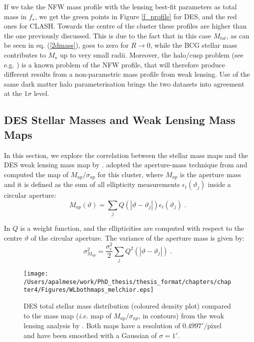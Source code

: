 {If we take the NFW mass profile with the lensing best-fit parameters as total mass in $f_{\star}$, we get the green points in Figure \ref{f_profile} for DES, and the red ones for CLASH. Towards the centre of the cluster these profiles are higher than the one previously discussed. This is due to the fact that in this case $M_{tot}$, as  can be seen in eq. (\ref{2dmass}), goes to zero for $R \to 0$, while the BCG stellar mass contributes to $M_\star$ up to very small radii. Moreover, the halo/cusp problem (see e.g. \citealt{cusp}) is a known problem of the NFW profile, that will therefore produce different results from a non-parametric mass profile from weak lensing. Use of the same dark matter halo parameterisation brings the two datasets into agreement at the $1\sigma$ level.


\subsection{DES Stellar Masses and Weak Lensing Mass Maps}\label{sec:maps}
In this section, we explore the correlation between the stellar mass maps and the DES weak lensing mass map by \citet{melchior}.
\citet{melchior} adopted the aperture-mass technique from \citet{schneider1996} and computed the map of $M_{ap}/\sigma_{ap}$ for this cluster, where $M_{ap}$ is the aperture mass and it is defined as the sum of all ellipticity measurements $\epsilon_t(\vartheta_j)$ inside a circular aperture:
\begin{equation}
M_{ap}(\vartheta)=\sum_jQ(|\vartheta - \vartheta_j|)\epsilon_t(\vartheta_j)\;.\label{mapeq}
\end{equation}

In  $Q$ is a weight function, and the ellipticities are computed with respect to the centre $\vartheta$ of the circular aperture. The variance of the aperture mass is given by:
\begin{equation}
\sigma^2_{M_{ap}}=\frac{\sigma_{\epsilon}^2}{2}\sum_jQ^2(|\vartheta - \vartheta_j|)\;.
\end{equation}

\begin{figure}
\centering
\texttt{[image: /Users/apalmese/work/PhD\_thesis/thesis\_format/chapters/chapter4/Figures/WLbothmaps\_melchior.eps]}
\caption{DES total stellar mass distribution (coloured density plot) compared to the mass map (\emph{i.e.} map of $M_{ap}/\sigma_{ap}$, in contours) from the weak lensing analysis by \protect\citet{melchior}. Both maps have a resolution of $0.4997'/$pixel and have been smoothed with a Gaussian of $\sigma = 1'$.}\label{densitymapsWL}
\end{figure}

}
